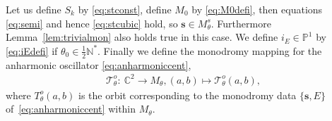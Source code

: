 \documentclass[pdftex]{sigma}
\numberwithin{equation}{section}
\begin{document}
Let us def\/ine $S_k$ by \eqref{eq:stconst}, def\/ine $M_0$ by \eqref{eq:M0defi}, then equations \eqref{eq:semi} and hence \eqref{eq:stcubic} hold, so $\mathbf{s}\in M_\theta^s$. Furthermore Lemma~\ref{lem:trivialmon} also holds true in this case. We def\/ine $i_E\in\mathbb{P}^1$ by \eqref{eq:iEdefi} if $\theta_0\in\tfrac{1}{2}\mathbb{N}^*$. Finally we def\/ine the monodromy mapping for the anharmonic oscillator \eqref{eq:anharmoniccent},
\begin{gather*}%
\mathcal{T}_\theta^o\colon \ \mathbb{C}^2\rightarrow M_\theta,(a,b)\mapsto \mathcal{T}_\theta^o(a,b),
\end{gather*}
where $T_\theta^o(a,b)$ is the orbit corresponding to the monodromy data $\{\mathbf{s},E\}$ of~\eqref{eq:anharmoniccent} within $M_\theta$.
\end{document}
